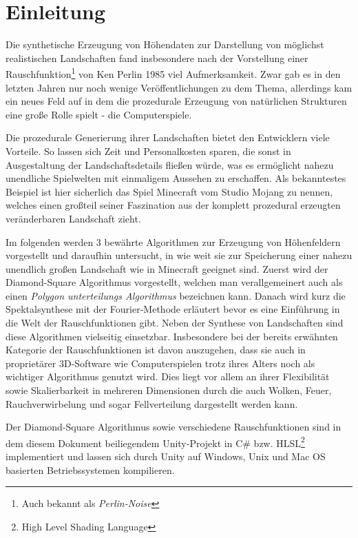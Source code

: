\chapter{Einleitung}

Die synthetische Erzeugung von Höhendaten zur Darstellung von möglichst realistischen Landschaften fand insbesondere nach der Vorstellung einer Rauschfunktion\footnote{Auch bekannt als \emph{Perlin-Noise}} von Ken Perlin 1985\cite{PERLIN1985} viel Aufmerksamkeit. Zwar gab es in den letzten Jahren nur noch wenige Veröffentlichungen zu dem Thema, allerdings kam ein neues Feld auf in dem die prozedurale Erzeugung von natürlichen Strukturen eine große Rolle spielt - die Computerspiele.

Die prozedurale Generierung ihrer Landschaften bietet den Entwicklern viele Vorteile. 
So lassen sich Zeit und Personalkosten sparen, die sonst in Ausgestaltung der Landschaftsdetails fließen würde, was es ermöglicht nahezu unendliche Spielwelten mit einmaligem Aussehen zu erschaffen.
Als bekanntestes Beispiel ist hier sicherlich das Spiel Minecraft vom Studio Mojang zu nennen, welches einen großteil seiner Faszination aus der komplett prozedural erzeugten veränderbaren Landschaft zieht.

Im folgenden werden 3 bewährte Algorithmen zur Erzeugung von Höhenfeldern vorgestellt und daraufhin untersucht, in wie weit sie zur Speicherung einer nahezu unendlich großen Landschaft wie in Minecraft geeignet sind.
Zuerst wird der Diamond-Square Algorithmus\cite{DiamondSquare} vorgestellt, welchen man verallgemeinert auch als einen \emph{Polygon unterteilungs Algorithmus} bezeichnen kann. Danach wird kurz die Spektalsynthese mit der Fourier-Methode erläutert bevor es eine Einführung in die Welt der Rauschfunktionen gibt. 
Neben der Synthese von Landschaften sind diese Algorithmen vielseitig einsetzbar. Insbesondere bei der bereits erwähnten Kategorie der Rauschfunktionen ist davon auszugehen, dass sie auch in proprietärer 3D-Software wie Computerspielen trotz ihres Alters noch als wichtiger Algorithmus genutzt wird. Dies liegt vor allem an ihrer Flexibilität sowie Skalierbarkeit in mehreren Dimensionen durch die auch Wolken, Feuer, Rauchverwirbelung und sogar Fellverteilung dargestellt werden kann\cite{texturingAndModeling}.

Der Diamond-Square Algorithmus sowie verschiedene Rauschfunktionen sind in dem diesem Dokument beiliegendem Unity-Projekt in C\# bzw. HLSL\footnote{High Level Shading Language} implementiert und lassen sich durch Unity auf Windows, Unix und Mac OS basierten Betriebssystemen kompilieren.


